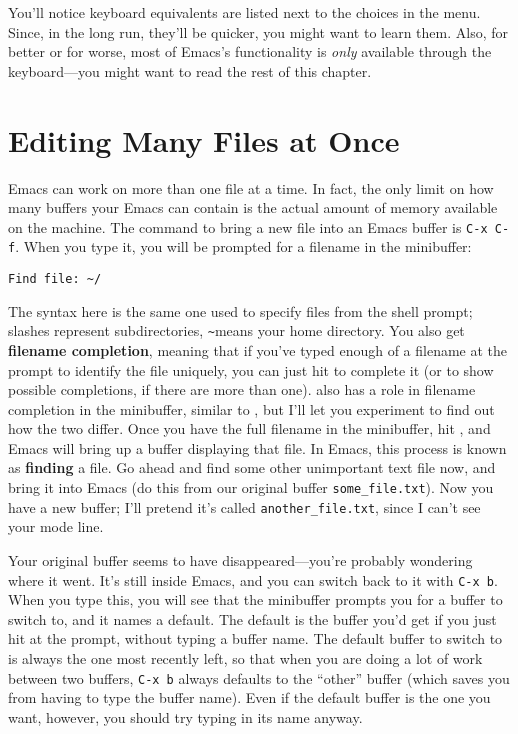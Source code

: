 You'll notice keyboard equivalents are listed next to the choices in
the menu. Since, in the long run, they'll be quicker, you might want
to learn them. Also, for better or for worse, most of Emacs's
functionality is {\em only\/} available through the keyboard---you
might want to read the rest of this chapter.

\section{Editing Many Files at Once}

Emacs can work on more than one file at a time.  In fact, the only
limit on how many buffers your Emacs can contain is the actual amount
of memory available on the machine. The command to bring a new file
into an Emacs buffer is {\tt C-x~C-f}.  When you type it, you will be
prompted for a filename in the minibuffer:

\begin{screen}
   \begin{verbatim}
Find file: ~/
   \end{verbatim}
\end{screen}

        The syntax here is the same one used to specify files from the
shell prompt; slashes represent subdirectories, \verb+~+means your
home directory.  You also get {\bf filename completion}, meaning
that if you've typed enough of a filename at the prompt to identify
the file uniquely, you can just hit  to complete it (or to
show possible completions, if there are more than one).  
also has a role in filename completion in the minibuffer, similar to
, but I'll let you experiment to find out how the two differ.
Once you have the full filename in the minibuffer, hit ,
and Emacs will bring up a buffer displaying that file.  In Emacs, this
process is known as {\bf finding} a file.  Go ahead and find some
other unimportant text file now, and bring it into Emacs (do this from
our original buffer {\tt some\_file.txt}).  Now you have a new buffer;
I'll pretend it's called {\tt another\_file.txt}, since I can't see
your mode line.

        Your original buffer seems to have disappeared---you're
probably wondering where it went.  It's still inside Emacs, and you
can switch back to it with {\tt C-x~b}.  When you type this, you will
see that the minibuffer prompts you for a buffer to switch to, and it
names a default.  The default is the buffer you'd get if you just hit
 at the prompt, without typing a buffer name.  The default
buffer to switch to is always the one most recently left, so that when
you are doing a lot of work between two buffers, {\tt C-x~b} always
defaults to the ``other'' buffer (which saves you from having to type
the buffer name).  Even if the default buffer is the one you want,
however, you should try typing in its name anyway.


